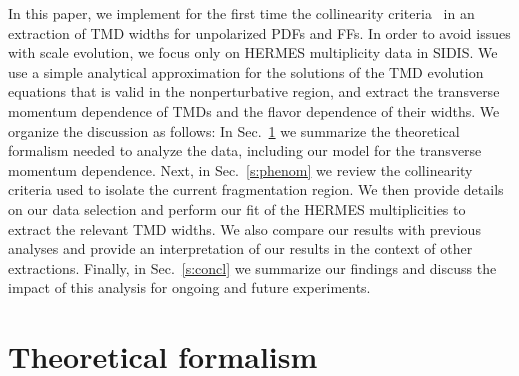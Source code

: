 \documentclass[final,3p,times,onecolumn,sort&compress,hidelinks]{elsarticle}
\newcommand{\cbl}{\color{blue}}
\begin{document}
  
In this paper, we implement for the first time the collinearity
criteria~\cite{Boglione:2016bph} in an extraction of TMD widths for
unpolarized PDFs and FFs.  In order to avoid issues with scale
evolution, we focus only on HERMES multiplicity data in SIDIS.
We use a simple analytical approximation for the solutions of the
TMD evolution equations that is valid in the nonperturbative region,
and extract the transverse momentum dependence of TMDs and the
flavor dependence of their widths.
%
We organize the discussion as follows: In Sec.~\ref{s:model} we 
summarize the theoretical formalism needed to analyze the data, 
including our model for the transverse momentum dependence.
{\cbl Next, in Sec.~\ref{s:phenom} we review the collinearity
criteria used to isolate the current fragmentation region.
We then provide details on our data selection and perform our}
fit of the HERMES multiplicities to extract the relevant TMD widths.
We also compare our results with previous analyses and provide an
interpretation of our results in the context of other extractions.
Finally, in Sec.~\ref{s:concl} we summarize our findings and discuss
the impact of this analysis for ongoing and future experiments.


\section{Theoretical formalism}
\label{s:model}
\end{document}
